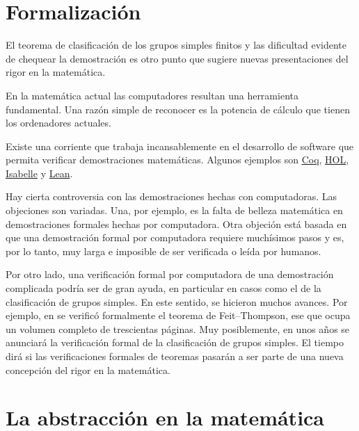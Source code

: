 \section*{Formalización}

El teorema de clasificación de los grupos simples finitos y las dificultad
evidente de chequear la demostración es otro punto que sugiere nuevas presentaciones
del rigor en la matemática. 

En la matemática actual las computadores resultan una herramienta fundamental. Una razón 
simple de reconocer es la potencia de cálculo que tienen los ordenadores actuales. 

Existe una corriente que trabaja incansablemente en el desarrollo de software  
que permita verificar demostraciones matemáticas. Algunos ejemplos son 
\href{https://coq.inria.fr/}{Coq}, \href{https://hol-theorem-prover.org/}{HOL}, 
\href{https://isabelle.in.tum.de/}{Isabelle} 
y \href{https://leanprover.github.io/}{Lean}. 

Hay cierta controversia con las demostraciones hechas con computadoras. Las objeciones
son variadas. Una, por ejemplo, es la 
falta de belleza matemática en demostraciones formales hechas por computadora. Otra
objeción está basada en que una demostración formal por computadora requiere muchísimos pasos
y es, por lo tanto, muy larga e imposible de ser verificada o leída por humanos. 

Por otro lado, una verificación formal por computadora de una demostración complicada
podría ser de gran ayuda, en particular en casos como el de la clasificación de grupos
simples. En este sentido, se hicieron muchos avances. Por ejemplo, 
en se verificó formalmente el teorema de Feit--Thompson, ese que ocupa un volumen
completo de trescientas páginas. Muy posiblemente, en unos años 
se anunciará la verificación formal de la clasificación de grupos simples. El tiempo 
dirá si las verificaciones formales de teoremas pasarán a ser parte de una nueva concepción
del rigor en la matemática. 

\section*{La abstracción en la matemática}

